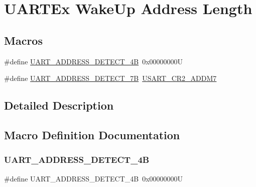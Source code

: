\hypertarget{group___u_a_r_t_ex___wake_up___address___length}{}\section{U\+A\+R\+T\+Ex Wake\+Up Address Length}
\label{group___u_a_r_t_ex___wake_up___address___length}
\subsection*{Macros}
\begin{DoxyCompactItemize}
\item 
\#define \mbox{\hyperlink{group___u_a_r_t_ex___wake_up___address___length_ga6599292020c484faeea894307d9dc6d5}{U\+A\+R\+T\+\_\+\+A\+D\+D\+R\+E\+S\+S\+\_\+\+D\+E\+T\+E\+C\+T\+\_\+4B}}~0x00000000U
\item 
\#define \mbox{\hyperlink{group___u_a_r_t_ex___wake_up___address___length_ga4dbd5995e0e4998cb1a312c183d7cbb0}{U\+A\+R\+T\+\_\+\+A\+D\+D\+R\+E\+S\+S\+\_\+\+D\+E\+T\+E\+C\+T\+\_\+7B}}~\mbox{\hyperlink{group___peripheral___registers___bits___definition_ga2d8588feb26d8b36054a060d6b691823}{U\+S\+A\+R\+T\+\_\+\+C\+R2\+\_\+\+A\+D\+D\+M7}}
\end{DoxyCompactItemize}


\subsection{Detailed Description}


\subsection{Macro Definition Documentation}
\mbox{\label{group___u_a_r_t_ex___wake_up___address___length_ga6599292020c484faeea894307d9dc6d5}} 
\subsubsection{\texorpdfstring{UART\_ADDRESS\_DETECT\_4B}{UART\_ADDRESS\_DETECT\_4B}}
{\footnotesize\ttfamily \#define U\+A\+R\+T\+\_\+\+A\+D\+D\+R\+E\+S\+S\+\_\+\+D\+E\+T\+E\+C\+T\+\_\+4B~0x00000000U}


